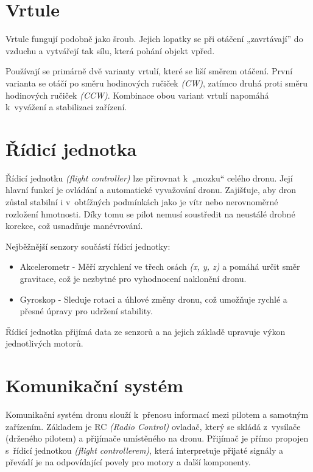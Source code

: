 \documentclass[12pt]{report}
\begin{document}
\section[Vrtule]{Vrtule}

Vrtule fungují podobně jako šroub. Jejich lopatky se při otáčení „zavrtávají” do vzduchu a vytvářejí tak sílu, která pohání objekt vpřed.

Používají se primárně dvě varianty vrtulí, které se liší směrem otáčení. První varianta se otáčí po směru hodinových ručiček \textit{(CW)}, zatímco druhá proti směru hodinových ručiček \textit{(CCW)}. Kombinace obou variant vrtulí napomáhá k~vyvážení a stabilizaci zařízení. \cite{mainbook} \cite{dojo}

\section[Řídicí jednotka]{Řídicí jednotka}

Řídicí jednotku \textit{(flight controller)} lze přirovnat k~„mozku“ celého dronu. Její hlavní funkcí je ovládání a automatické vyvažování dronu. Zajišťuje, aby dron zůstal stabilní i v~obtížných podmínkách jako je vítr nebo nerovnoměrné rozložení hmotnosti. Díky tomu se pilot nemusí soustředit na neustálé drobné korekce, což usnadňuje manévrování.

Nejběžnější senzory součástí řídicí jednotky:
\begin{itemize}
	\item Akcelerometr -  Měří zrychlení ve třech osách \textit{(x, y, z)} a pomáhá určit směr gravitace, což je nezbytné pro vyhodnocení naklonění dronu.
	\item Gyroskop - Sleduje rotaci a úhlové změny dronu, což umožňuje rychlé a přesné úpravy pro udržení stability.
\end{itemize}

Řídicí jednotka přijímá data ze senzorů a na jejich základě upravuje výkon jednotlivých motorů. \cite{mainbook}

\section[Komunikační systém]{Komunikační systém}
Komunikační systém dronu slouží k~přenosu informací mezi pilotem a samotným zařízením. Základem je RC \textit{(Radio Control)} ovladač, který se skládá z~vysílače (drženého pilotem) a přijímače umístěného na dronu. Přijímač je přímo propojen s~řídicí jednotkou \textit{(flight controllerem)}, která interpretuje přijaté signály a převádí je na odpovídající povely pro motory a další komponenty.
\end{document}
